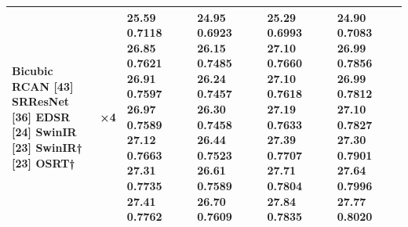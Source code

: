 \begin{tabular}{llllll}
\toprule
Bicubic RCAN [43] SRResNet [36] EDSR [24] SwinIR [23] SwinIR† [23] OSRT† & ×4 & 25.59 0.7118 26.85 0.7621 26.91 0.7597 26.97 0.7589 27.12 0.7663 27.31 0.7735 27.41 0.7762 & 24.95 0.6923 26.15 0.7485 26.24 0.7457 26.30 0.7458 26.44 0.7523 26.61 0.7589 26.70 0.7609 & 25.29 0.6993 27.10 0.7660 27.10 0.7618 27.19 0.7633 27.39 0.7707 27.71 0.7804 27.84 0.7835 & 24.90 0.7083 26.99 0.7856 26.99 0.7812 27.10 0.7827 27.30 0.7901 27.64 0.7996 27.77 0.8020 \\
\midrule
\bottomrule
\end{tabular}
